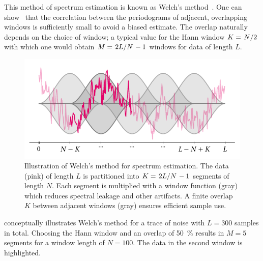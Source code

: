 This method of spectrum estimation is known as Welch's method~\cite{Welch1967}.
One can show~\cite{Welch1967} that the correlation between the periodograms of adjacent, overlapping windows is sufficiently small to avoid a biased estimate.
The overlap naturally depends on the choice of window; a typical value for the Hann window $K = \flatfrac{N}{2}$ with which one would obtain $M = \flatfrac{2L}{N} - 1$ windows for data of length $L$.
\begin{figure}
    \centering
    \includegraphics[width=\textwidth]{img/pdf/spectrometer/welch}
    \caption[]{
        Illustration of Welch's method for spectrum estimation.
        The data (pink) of length $L$ is partitioned into $K = \flatfrac{2L}{N} - 1$ segments of length $N$.
        Each segment is multiplied with a window function (gray) which reduces spectral leakage and other artifacts.
        A finite overlap $K$ between adjacent windows (gray) ensures efficient sample use.
    }
    \label{fig:speck:welch}
\end{figure}

 conceptually illustrates Welch's method for a trace of \oneoverf noise with $L = 300$ samples in total.
Choosing the Hann window and an overlap of \qty{50}{\percent} results in $M=5$ segments for a window length of $N=100$.
The data in the second window is highlighted.

